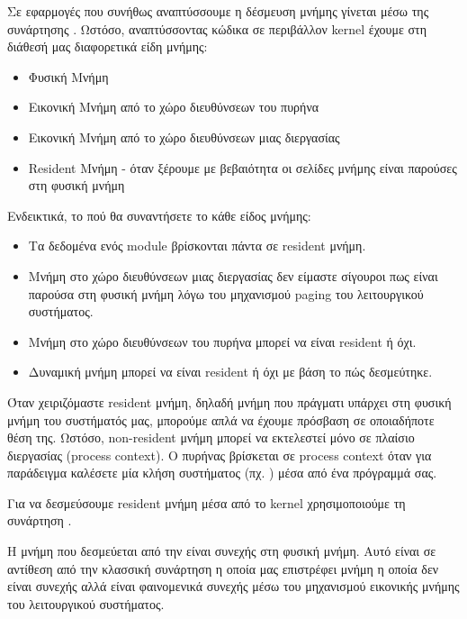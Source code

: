 \documentclass[18pt]{extarticle}
\begin{document}
Σε εφαρμογές που συνήθως αναπτύσσουμε η δέσμευση μνήμης γίνεται μέσω της συνάρτησης .
Ωστόσο, αναπτύσσοντας κώδικα σε περιβάλλον kernel έχουμε στη διάθεσή μας διαφορετικά είδη μνήμης:

\begin{itemize}
    \item Φυσική Μνήμη
    \item Εικονική Μνήμη από το χώρο διευθύνσεων του πυρήνα
    \item Εικονική Μνήμη από το χώρο διευθύνσεων μιας διεργασίας
    \item Resident Μνήμη - όταν ξέρουμε με βεβαιότητα οι σελίδες μνήμης είναι παρούσες στη φυσική μνήμη
\end{itemize}

Ενδεικτικά, το πού θα συναντήσετε το κάθε είδος μνήμης:

\begin{itemize}
    \item Τα δεδομένα ενός module βρίσκονται πάντα σε resident μνήμη.
    \item Μνήμη στο χώρο διευθύνσεων μιας διεργασίας δεν είμαστε σίγουροι πως είναι παρούσα στη φυσική μνήμη λόγω του μηχανισμού paging του λειτουργικού συστήματος.
    \item Μνήμη στο χώρο διευθύνσεων του πυρήνα μπορεί να είναι resident ή όχι.
    \item Δυναμική μνήμη μπορεί να είναι resident ή όχι με βάση το πώς δεσμεύτηκε.
\end{itemize}


Όταν χειριζόμαστε resident μνήμη, δηλαδή μνήμη που πράγματι υπάρχει στη φυσική μνήμη του συστήματός μας, μπορούμε απλά να έχουμε πρόσβαση σε οποιαδήποτε θέση της.
Ωστόσο, non-resident μνήμη μπορεί να εκτελεστεί μόνο σε πλαίσιο διεργασίας (process context).
Ο πυρήνας βρίσκεται σε process context όταν για παράδειγμα καλέσετε μία κλήση συστήματος (πχ. ) μέσα από ένα πρόγραμμά σας.

Για να δεσμεύσουμε resident μνήμη μέσα από το kernel χρησιμοποιούμε τη συνάρτηση .

\begin{info}[Σημείωση]
    Η μνήμη που δεσμεύεται από την  είναι συνεχής στη φυσική μνήμη.
    Αυτό είναι σε αντίθεση από την κλασσική συνάρτηση  η οποία 
    μας επιστρέφει μνήμη η οποία δεν είναι συνεχής αλλά είναι φαινομενικά συνεχής μέσω του μηχανισμού εικονικής μνήμης του λειτουργικού συστήματος.
\end{info}
\end{document}
